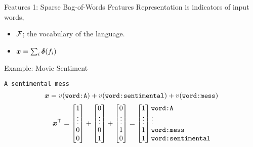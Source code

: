\documentclass{beamer}
\begin{document}
\begin{frame}{Features 1: Sparse Bag-of-Words Features}
  Representation is indicators of input words, 
  \begin{itemize}
  \item $\mathcal{F}$; the vocabulary of the language.
  \item $\boldsymbol{x} = \sum_{i} \boldsymbol{\delta}(f_i)$ 
  \end{itemize}

  Example: Movie Sentiment
  \begin{center}
    \texttt{A sentimental mess}
    \[ \boldsymbol{x} = v(\texttt{word:A}) + v(\texttt{word:sentimental}) +
    v(\texttt{word:mess}) \] 
    \[ \boldx^\top =\begin{bmatrix} 1 \\ \vdots
        \\ 0\\ 0 \\ \end{bmatrix} +\begin{bmatrix} 0 \\
        \vdots \\ 0\\ 1 \\ \end{bmatrix} +
     \begin{bmatrix} 0 \\ \vdots \\ 1\\ 0 \\ \end{bmatrix} 
    =\begin{bmatrix} 1 \\ \vdots \\ 1 \\ 1 \\ \end{bmatrix} 
    \begin{matrix*}[l] \mathrm{\texttt{word:A}} \\ \vdots \\ \mathrm{\texttt{word:mess}} \\ \mathrm{\texttt{word:sentimental}} \\ \end{matrix*}
     \]
  \end{center}
\end{frame}
\end{document}
